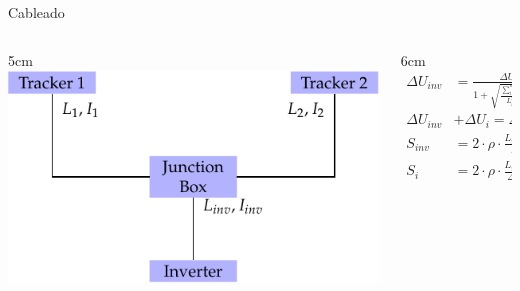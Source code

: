 \documentclass[xcolor={usenames,svgnames,dvipsnames}]{beamer}
\begin{document}
\begin{frame}[label=sec-2-5-4]{Cableado}
\begin{columns}
\begin{column}{5cm\textwidth}
\includegraphics[width=.9\linewidth]{../figs/wiring.pdf}
\end{column}
\begin{column}{6cm\textwidth}
$$\begin{aligned}
    \Delta U_{inv} &= \frac{\Delta U}{1+\sqrt{\frac{\sum_{i=1}^n
          L_{i}^2 \cdot I_{i}}{L_{inv}^2 \cdot I_{inv}}}} \\
    \Delta U_{inv} &+ \Delta U_i = \Delta U\\
    S_{inv} &= 2 \cdot \rho \cdot \frac{L_{inv} \cdot
      I_{inv}}{\Delta U_{inv}} \\
    S_{i} &= 2 \cdot \rho \cdot \frac{L_{i} \cdot I_i}{\Delta U_i}
  \end{aligned}$$
\end{column}
\end{columns}
\end{frame}
\end{document}
